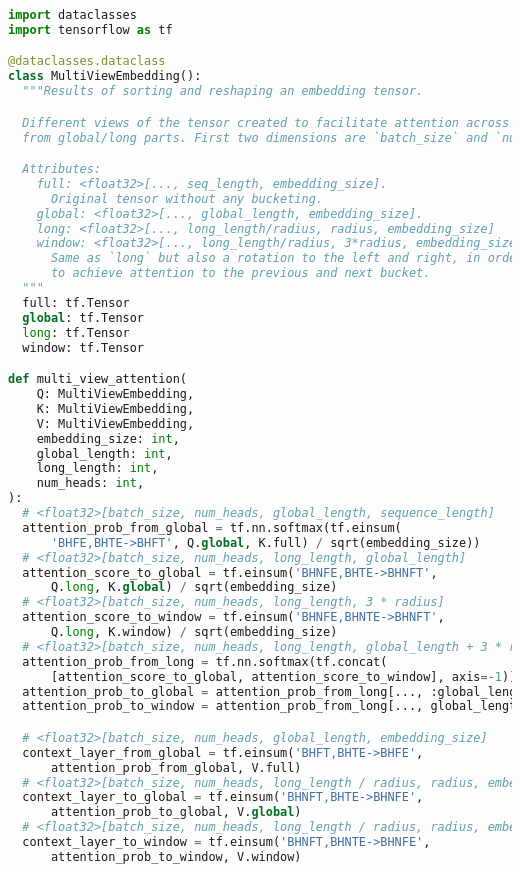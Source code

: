 \documentclass[11pt]{article}
\begin{document}
\lstset{style=mystyle}

\begin{figure*}\begin{center}
{\small
\begin{lstlisting}[language=Python]
import dataclasses
import tensorflow as tf

@dataclasses.dataclass
class MultiViewEmbedding():
  """Results of sorting and reshaping an embedding tensor.

  Different views of the tensor created to facilitate attention across tokens
  from global/long parts. First two dimensions are `batch_size` and `num_heads`:

  Attributes:
    full: <float32>[..., seq_length, embedding_size]. 
      Original tensor without any bucketing.
    global: <float32>[..., global_length, embedding_size].
    long: <float32>[..., long_length/radius, radius, embedding_size]
    window: <float32>[..., long_length/radius, 3*radius, embedding_size]
      Same as `long` but also a rotation to the left and right, in order
      to achieve attention to the previous and next bucket.
  """
  full: tf.Tensor
  global: tf.Tensor
  long: tf.Tensor
  window: tf.Tensor

def multi_view_attention(
    Q: MultiViewEmbedding,
    K: MultiViewEmbedding,
    V: MultiViewEmbedding,
    embedding_size: int,
    global_length: int,
    long_length: int,
    num_heads: int,
):
  # <float32>[batch_size, num_heads, global_length, sequence_length]
  attention_prob_from_global = tf.nn.softmax(tf.einsum(
      'BHFE,BHTE->BHFT', Q.global, K.full) / sqrt(embedding_size))
  # <float32>[batch_size, num_heads, long_length, global_length]
  attention_score_to_global = tf.einsum('BHNFE,BHTE->BHNFT',
      Q.long, K.global) / sqrt(embedding_size)
  # <float32>[batch_size, num_heads, long_length, 3 * radius]
  attention_score_to_window = tf.einsum('BHNFE,BHNTE->BHNFT',
      Q.long, K.window) / sqrt(embedding_size)
  # <float32>[batch_size, num_heads, long_length, global_length + 3 * radius]
  attention_prob_from_long = tf.nn.softmax(tf.concat(
      [attention_score_to_global, attention_score_to_window], axis=-1))
  attention_prob_to_global = attention_prob_from_long[..., :global_length]
  attention_prob_to_window = attention_prob_from_long[..., global_length:]

  # <float32>[batch_size, num_heads, global_length, embedding_size]
  context_layer_from_global = tf.einsum('BHFT,BHTE->BHFE',
      attention_prob_from_global, V.full)
  # <float32>[batch_size, num_heads, long_length / radius, radius, embedding_size]
  context_layer_to_global = tf.einsum('BHNFT,BHTE->BHNFE',
      attention_prob_to_global, V.global)
  # <float32>[batch_size, num_heads, long_length / radius, radius, embedding_size]
  context_layer_to_window = tf.einsum('BHNFT,BHNTE->BHNFE',
      attention_prob_to_window, V.window)
      

\end{lstlisting}}
\end{center}
\end{figure*}
\end{document}
